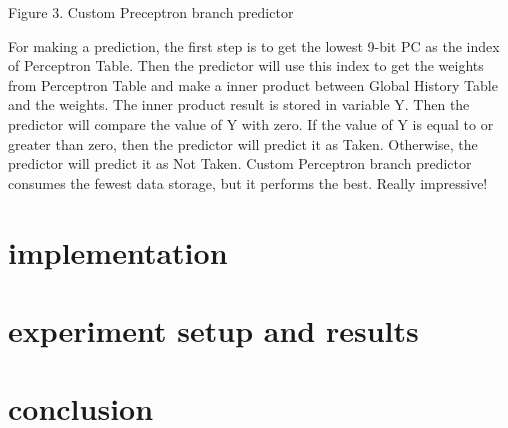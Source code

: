 \documentclass[conference]{IEEEtran}
\begin{document}
\begin{center}
  {\small Figure 3. Custom Preceptron branch predictor}
\end{center}
For making a prediction, the first step is to get the lowest 9-bit PC as the index of Perceptron Table. Then the predictor will use this index to get the weights from Perceptron Table and make a inner product between Global History Table and the weights.
The inner product result is stored in variable Y. Then the predictor will compare the value of Y with zero. If the value of Y is equal to or greater than zero, then the predictor will predict it as Taken. Otherwise, the predictor will predict it as 
Not Taken. Custom Perceptron branch predictor consumes the fewest data storage, but it performs the best. Really impressive!

\section{implementation}

\section{experiment setup and results}

\section{conclusion}





\end{document}
